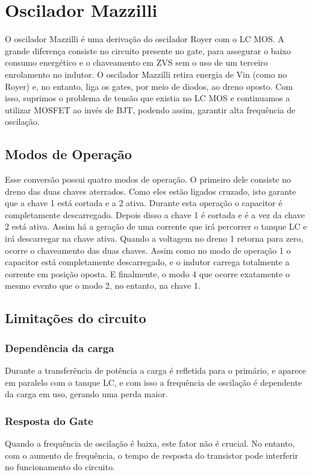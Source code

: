 \section{Oscilador Mazzilli}
O oscilador Mazzilli é uma derivação do oscilador Royer com o LC MOS. A grande diferença consiste no circuito presente no gate, para assegurar o baixo consumo energético e o chaveamento em ZVS sem o uso de um terceiro enrolamento no indutor. O oscilador Mazzilli retira energia de Vin (como no Royer) e, no entanto, liga os gates, por meio de diodos, ao dreno oposto. Com isso, suprimos o problema de tensão que existia no LC MOS e continuamos a utilizar MOSFET ao invés de BJT, podendo assim, garantir alta frequência de oscilação.

\subsection{Modos de Operação}
Esse conversão possui quatro modos de operação. O primeiro dele consiste no dreno das duas chaves aterrados. Como eles estão ligados cruzado, isto garante que a chave 1 está cortada e a 2 ativa. Durante esta operação o capacitor é completamente descarregado. Depois disso a chave 1 é cortada e é a vez da chave 2 está ativa. Assim há a geração de uma corrente que irá percorrer o tanque LC e irá descarregar na chave ativa. Quando a voltagem no dreno 1 retorna para zero, ocorre o chaveamento das duas chaves. Assim como no modo de operação 1 o capacitor está completamente descarregado, e o indutor carrega totalmente a corrente em posição oposta. E finalmente, o modo 4 que ocorre exatamente o mesmo evento que o modo 2, no entanto, na chave 1.

\subsection{Limitações do circuito}

\subsubsection{Dependência da carga}
Durante a transferência de potência a carga é refletida para o primário, e aparece em paralelo com o tanque LC, e com isso a frequência de oscilação é dependente da carga em uso, gerando uma perda maior.
\subsubsection{Resposta do Gate}
Quando a frequência de oscilação é baixa, este fator não é crucial. No entanto, com o aumento de frequência, o tempo de resposta do transistor pode interferir no funcionamento do circuito.

